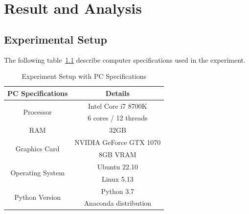 \chapter{Result and Analysis}\label{ch:result-and-analysis}


\section{Experimental Setup}\label{sec:experimental-setup}
The following table~\ref{tab:experiment_setup} describe computer specifications used in the experiment.
\begin{table}[htbp]
    \centering
    \caption{Experiment Setup with PC Specifications}
    \label{tab:experiment_setup}
    \begin{tabular}{|c|c|}
        \hline
        \textbf{PC Specifications}        & \textbf{Details}        \\
        \hline
        \multirow{2}{*}{Processor}        & Intel Core i7 8700K     \\
        & 6 cores / 12 threads    \\
        \hline
        RAM                              & 32GB                    \\
        \hline
        \multirow{2}{*}{Graphics Card}    & NVIDIA GeForce GTX 1070 \\
        & 8GB VRAM                \\
        \hline
        \multirow{2}{*}{Operating System} & Ubuntu 22.10            \\
        & Linux 5.13              \\
        \hline
        \multirow{2}{*}{Python Version}   & Python 3.7              \\
        & Anaconda distribution   \\
        \hline
    \end{tabular}
\end{table}

